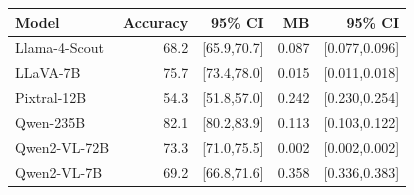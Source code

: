 \begin{tabular}{lrrrr}
\toprule
Model & Accuracy & 95\% CI & MB & 95\% CI \\
\midrule
Llama-4-Scout & 68.2 & [65.9,70.7] & 0.087 & [0.077,0.096] \\
LLaVA-7B & 75.7 & [73.4,78.0] & 0.015 & [0.011,0.018] \\
Pixtral-12B & 54.3 & [51.8,57.0] & 0.242 & [0.230,0.254] \\
Qwen-235B & 82.1 & [80.2,83.9] & 0.113 & [0.103,0.122] \\
Qwen2-VL-72B & 73.3 & [71.0,75.5] & 0.002 & [0.002,0.002] \\
Qwen2-VL-7B & 69.2 & [66.8,71.6] & 0.358 & [0.336,0.383] \\
\bottomrule
\end{tabular}
